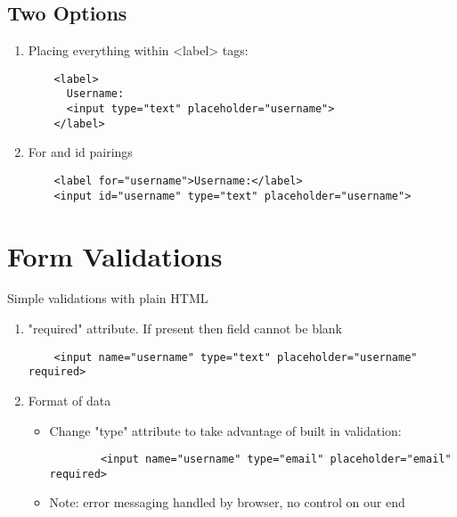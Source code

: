 \documentclass{article}
\begin{document}
\subsection{Two Options}
\begin{enumerate}
	\item Placing everything within <label> tags:
	\begin{verbatim}
	<label>
	  Username:
	  <input type="text" placeholder="username">
	</label>
	\end{verbatim}
	\item For and id pairings
	\begin{verbatim}
	<label for="username">Username:</label>
	<input id="username" type="text" placeholder="username">
	\end{verbatim}
\end{enumerate}

\section{Form Validations}
Simple validations with plain HTML
\begin{enumerate}
	\item "required" attribute. If present then field cannot be blank
	\begin{verbatim}
	<input name="username" type="text" placeholder="username" required>
	\end{verbatim}
	\item Format of data
	\begin{itemize}
		\item Change "type" attribute to take advantage of built in validation:
		\begin{verbatim}
		<input name="username" type="email" placeholder="email" required>
		\end{verbatim}
		\item Note: error messaging handled by browser, no control on our end
	\end{itemize}
\end{enumerate}
\end{document}
